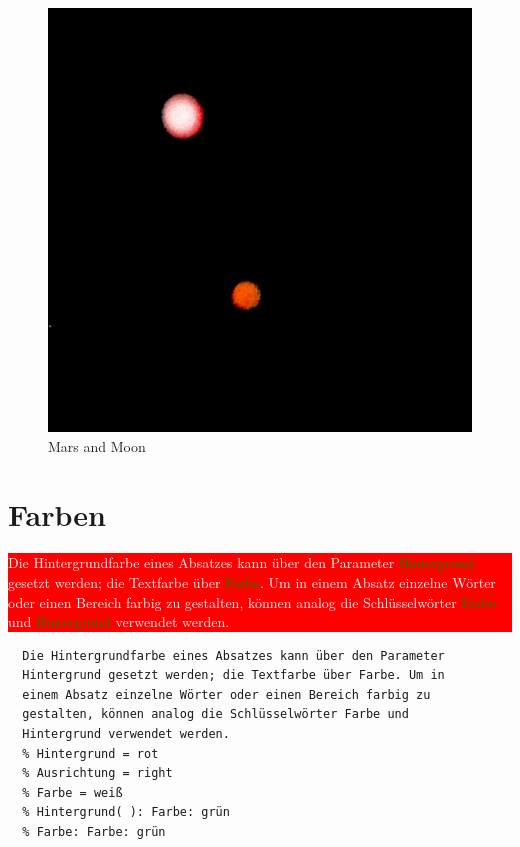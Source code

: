 \documentclass{scrartcl}
\begin{document}
\begin{figure}[hbt]
\raggedleft%
\includegraphics[height=.40\textheight]{Image.png}
\caption{Mars and Moon}
\label{bild1}
\end{figure}


\section{Farben}

\colorbox{red}{\parbox{\linewidth}{%
{\raggedleft%
\textcolor{white}{%
Die Hintergrundfarbe eines Absatzes kann über den Parameter
\textcolor{green}{Hintergrund} gesetzt werden; die Textfarbe über \textcolor{green}{Farbe}. Um in
einem Absatz einzelne Wörter oder einen Bereich farbig zu
gestalten, können analog die Schlüsselwörter \textcolor{green}{Farbe} und
\textcolor{green}{Hintergrund} verwendet werden.}\\}
}
}

\begin{verbatim}
  Die Hintergrundfarbe eines Absatzes kann über den Parameter
  Hintergrund gesetzt werden; die Textfarbe über Farbe. Um in
  einem Absatz einzelne Wörter oder einen Bereich farbig zu
  gestalten, können analog die Schlüsselwörter Farbe und
  Hintergrund verwendet werden.
  % Hintergrund = rot
  % Ausrichtung = right
  % Farbe = weiß
  % Hintergrund( ): Farbe: grün
  % Farbe: Farbe: grün
\end{verbatim}
\end{document}

